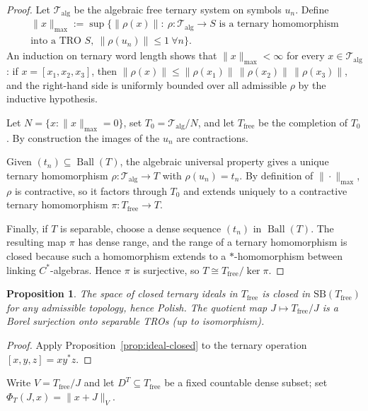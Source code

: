 \documentclass[12pt,fleqn,a4paper]{amsart}
\renewcommand{\le}{\leqslant}
\numberwithin{equation}{section}
\newtheorem{proposition}[theorem]{Proposition}
\theoremstyle{definition}
\newcommand{\SB}{\mathrm{SB}}
\begin{document}
\begin{proof}
Let $\mathcal T_{\mathrm{alg}}$ be the algebraic free ternary system on symbols
$u_n$.  Define
\begin{multline*}
\|x\|_{\max}
:=
\sup\bigl\{\|\rho(x)\|:\ \rho:\mathcal T_{\mathrm{alg}}\to S
\text{ is a ternary homomorphism}\\
\text{into a TRO }S,\ 
\|\rho(u_n)\|\le 1\ \forall n\bigr\}.
\end{multline*}
An induction on ternary word length shows that $\|x\|_{\max}<\infty$ for every
$x\in \mathcal T_{\mathrm{alg}}$: if $x=[x_1,x_2,x_3]$, then
$\|\rho(x)\|\le\|\rho(x_1)\|\,\|\rho(x_2)\|\,\|\rho(x_3)\|$,
and the right-hand side is uniformly bounded over all admissible $\rho$ by the
inductive hypothesis.

Let $N=\{x:\|x\|_{\max}=0\}$, set $T_0=\mathcal T_{\mathrm{alg}}/N$, and let
$T_{\mathrm{free}}$ be the completion of $T_0$.  By construction the images of
the $u_n$ are contractions.

Given $(t_n)\subseteq \operatorname{Ball}(T)$, the algebraic universal property
gives a unique ternary homomorphism
$\rho:\mathcal T_{\mathrm{alg}}\to T$ with $\rho(u_n)=t_n$.
By definition of $\|\cdot\|_{\max}$, $\rho$ is contractive, so it factors
through $T_0$ and extends uniquely to a contractive ternary homomorphism
$\pi:T_{\mathrm{free}}\to T$.

Finally, if $T$ is separable, choose a dense sequence $(t_n)$ in
$\operatorname{Ball}(T)$.  The resulting map $\pi$ has dense range, and the
range of a ternary homomorphism is closed because such a homomorphism extends
to a $*$-homomorphism between linking $C^*$-algebras.  Hence $\pi$ is
surjective, so $T\cong T_{\mathrm{free}}/\ker\pi$.
\end{proof}

\begin{proposition}\label{prop:TRO-polish}
The space of closed ternary ideals in $T_{\mathrm{free}}$ is closed in
$\SB(T_{\mathrm{free}})$ for any admissible topology, hence Polish.
The quotient map $J\mapsto T_{\mathrm{free}}/J$ is a Borel surjection onto separable
TROs (up to isomorphism).
\end{proposition}

\begin{proof}
Apply Proposition~\ref{prop:ideal-closed} to the ternary operation
$[x,y,z]=xy^*z$.
\end{proof}

Write $V=T_{\mathrm{free}}/J$ and let $D^T\subseteq T_{\mathrm{free}}$ be a fixed
countable dense subset; set $\Phi_T(J,x)=\|x+J\|_{V}$.
\end{document}
